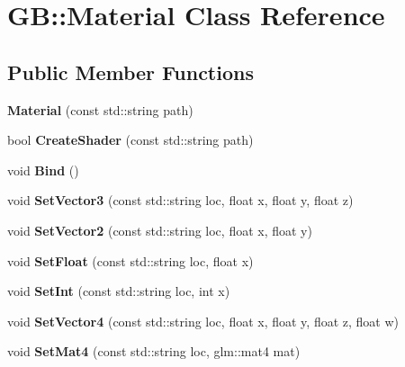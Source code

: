 \hypertarget{class_g_b_1_1_material}{}\section{GB\+::Material Class Reference}
\label{class_g_b_1_1_material}
\subsection*{Public Member Functions}
\begin{DoxyCompactItemize}
\item 
\mbox{\label{class_g_b_1_1_material_a210dafa0c3b4caa87b5f5afe38a4f3a3}} 
{\bfseries Material} (const std\+::string path)
\item 
\mbox{\label{class_g_b_1_1_material_a82710bbf17c0dea56c4f726440379dd9}} 
bool {\bfseries Create\+Shader} (const std\+::string path)
\item 
\mbox{\label{class_g_b_1_1_material_aaa5530b349fa0b7d611a8bc853f99893}} 
void {\bfseries Bind} ()
\item 
\mbox{\label{class_g_b_1_1_material_a6173488cdf77b6e4bd629bf7a2788cb3}} 
void {\bfseries Set\+Vector3} (const std\+::string loc, float x, float y, float z)
\item 
\mbox{\label{class_g_b_1_1_material_a568e7cc4d6e1207168fcf41a5cce6551}} 
void {\bfseries Set\+Vector2} (const std\+::string loc, float x, float y)
\item 
\mbox{\label{class_g_b_1_1_material_aa2bba22e8faffe9f66449d7c149a6ec2}} 
void {\bfseries Set\+Float} (const std\+::string loc, float x)
\item 
\mbox{\label{class_g_b_1_1_material_ae77fb9e9b4de2fe7aa6997d22b7a707f}} 
void {\bfseries Set\+Int} (const std\+::string loc, int x)
\item 
\mbox{\label{class_g_b_1_1_material_a3bb39d5099329a807c6412abc9c02186}} 
void {\bfseries Set\+Vector4} (const std\+::string loc, float x, float y, float z, float w)
\item 
\mbox{\label{class_g_b_1_1_material_a5176d278fa2bb9f80c8453b241478f98}} 
void {\bfseries Set\+Mat4} (const std\+::string loc, glm\+::mat4 mat)
\end{DoxyCompactItemize}
